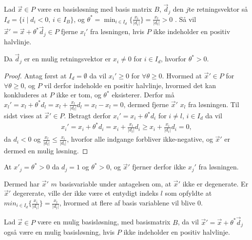 \begin{lma}
Lad $\vec{x} \in P$ være en basisløsning med basis matrix $B$, $\vec{d}_j$ den $j$te retningsvektor så $I_d = \{i \mid d_i < 0, \, i  \in I_B\}$, og $\theta^* = \min_{i \in I_d}\{\frac{x_i}{|d_i|}\}=\frac{x_l}{|d_l|} > 0$ . 
Så vil $\vec{x}' = \vec{x}+ \theta^* \vec{d}_j \in P$ fjerne $x_l'$ fra løsningen, hvis $P$ ikke indeholder en positiv halvlinje.
\label{lma:skalar}
\end{lma}

\begin{bem}
Da $\vec{d}_j$ er en mulig retningsvektor er $x_i\neq 0$ for $i \in I_d$, hvorfor $\theta^* > 0$.
\end{bem}

\begin{proof}
Antag først at $I_d = \emptyset$ da vil $x_i' \geq 0$ for $\forall \theta \geq 0$. 
Hvormed at $\vec{x}' \in P$ for $\forall \theta \geq 0$, og $P$ vil derfor indeholde en positiv halvlinje, hvormed det kan konkluderes at $P$ ikke er tom, og $\theta^*$ eksisterer.
Derfor må $x_l' = x_l + \theta^* d_l = x_l + \frac{x_l}{|d_l|}d_l = x_l - x_l = 0$, dermed fjerne $\vec{x}'$ $x_l$ fra løsningen.
Til sidst vises at $\vec{x}' \in P$. Betragt derfor $x_i' = x_i + \theta^* d_i$ for $i \neq l$, $i \in I_d$ da vil
\begin{align*}
x_i' = x_i + \theta^* d_i = x_i + \frac{x_l}{|d_l|}d_i \geq x_i + \frac{x_i}{|d_i|}d_i = 0,
\end{align*}
da $d_i < 0$ og $\frac{x_l}{|d_l|} \leq \frac{x_i}{|d_i|}$, hvorfor alle indgange forbliver ikke-negative, og $\vec{x}'$ er dermed en mulig løsning.
\end{proof}

\begin{bem}
At $x'_j = \theta^* >  0$ da $d_j = 1$ og $\theta^* > 0$, og $\vec{x}'$ fjerner derfor ikke $x_j'$ fra løsningen.
\end{bem}

Dermed har $\vec{x}'$ $m$ basisvariable under antagelsen om, at $\vec{x}'$ ikke er degenerate. Er $\vec{x}'$ degererate, ville der ikke være et entydigt indeks $l$ som opfyldte at $min_{i \in I_d}\{\frac{x_i}{|d_i|}\}=\frac{x_l}{|d_l|}$, hvormed at flere af basis variablene vil blive $0$. 

\begin{stn}
Lad $\vec{x}\in P$ være en mulig basisløsning, med basismatrix $B$, da vil $\vec{x}' = \vec{x}+ \theta^*\vec{d}_j$ også være en mulig basisløsning, hvis $P$ ikke indeholder en positiv halvlinje.
\end{stn}

